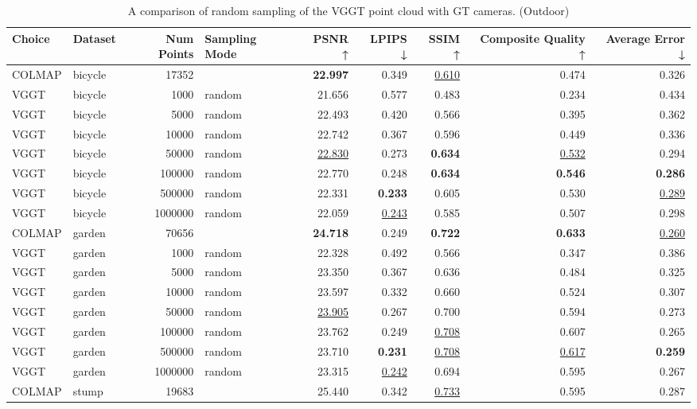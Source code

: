 \begin{table}[H]
\caption{A comparison of random sampling of the VGGT point cloud with GT cameras. (Outdoor)}
\label{tab:03_random_gt_cams_outdoor}
\centering
\scriptsize
\begin{tabular}{llrlrrrrr}
\toprule
Choice & Dataset & Num Points & Sampling Mode & PSNR ↑ & LPIPS ↓ & SSIM ↑ & Composite Quality ↑ & Average Error ↓ \\
\midrule
COLMAP & bicycle & 17352 &  & \textbf{22.997} & 0.349 & \underline{0.610} & 0.474 & 0.326 \\
VGGT & bicycle & 1000 & random & 21.656 & 0.577 & 0.483 & 0.234 & 0.434 \\
VGGT & bicycle & 5000 & random & 22.493 & 0.420 & 0.566 & 0.395 & 0.362 \\
VGGT & bicycle & 10000 & random & 22.742 & 0.367 & 0.596 & 0.449 & 0.336 \\
VGGT & bicycle & 50000 & random & \underline{22.830} & 0.273 & \textbf{0.634} & \underline{0.532} & 0.294 \\
VGGT & bicycle & 100000 & random & 22.770 & 0.248 & \textbf{0.634} & \textbf{0.546} & \textbf{0.286} \\
VGGT & bicycle & 500000 & random & 22.331 & \textbf{0.233} & 0.605 & 0.530 & \underline{0.289} \\
VGGT & bicycle & 1000000 & random & 22.059 & \underline{0.243} & 0.585 & 0.507 & 0.298 \\
\midrule
COLMAP & garden & 70656 &  & \textbf{24.718} & 0.249 & \textbf{0.722} & \textbf{0.633} & \underline{0.260} \\
VGGT & garden & 1000 & random & 22.328 & 0.492 & 0.566 & 0.347 & 0.386 \\
VGGT & garden & 5000 & random & 23.350 & 0.367 & 0.636 & 0.484 & 0.325 \\
VGGT & garden & 10000 & random & 23.597 & 0.332 & 0.660 & 0.524 & 0.307 \\
VGGT & garden & 50000 & random & \underline{23.905} & 0.267 & 0.700 & 0.594 & 0.273 \\
VGGT & garden & 100000 & random & 23.762 & 0.249 & \underline{0.708} & 0.607 & 0.265 \\
VGGT & garden & 500000 & random & 23.710 & \textbf{0.231} & \underline{0.708} & \underline{0.617} & \textbf{0.259} \\
VGGT & garden & 1000000 & random & 23.315 & \underline{0.242} & 0.694 & 0.595 & 0.267 \\
\midrule
COLMAP & stump & 19683 &  & 25.440 & 0.342 & \underline{0.733} & 0.595 & 0.287 \\

\end{tabular}
\end{table}
